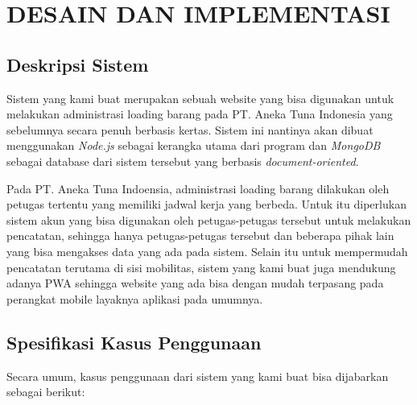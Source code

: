 \chapter{DESAIN DAN IMPLEMENTASI}
\vspace{4ex}

\setlength{\parindent}{7ex}


\section{Deskripsi Sistem}
\vspace{1ex}

Sistem yang kami buat merupakan sebuah website yang bisa digunakan untuk melakukan administrasi loading barang pada PT. Aneka Tuna Indonesia yang sebelumnya secara penuh berbasis kertas.
Sistem ini nantinya akan dibuat menggunakan \emph{Node.js} sebagai kerangka utama dari program dan \emph{MongoDB} sebagai database dari sistem tersebut yang berbasis \emph{document-oriented}.
\vspace{0.5ex}

Pada PT. Aneka Tuna Indoensia, administrasi loading barang dilakukan oleh petugas tertentu yang memiliki jadwal kerja yang berbeda.
Untuk itu diperlukan sistem akun yang bisa digunakan oleh petugas-petugas tersebut untuk melakukan pencatatan, sehingga hanya petugas-petugas tersebut dan beberapa pihak lain yang bisa mengakses data yang ada pada sistem.
Selain itu untuk mempermudah pencatatan terutama di sisi mobilitas, sistem yang kami buat juga mendukung adanya PWA sehingga website yang ada bisa dengan mudah terpasang pada perangkat mobile layaknya aplikasi pada umumnya.
\vspace{0.5ex}

\section{Spesifikasi Kasus Penggunaan}

Secara umum, kasus penggunaan dari sistem yang kami buat bisa dijabarkan sebagai berikut:
\vspace{0.5ex}

